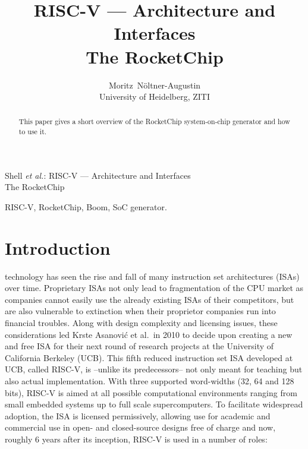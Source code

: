 \documentclass[journal,a4paper]{IEEEtran}
\def\krste/{Krste Asanovi\'c}
\begin{document}


\title{RISC-V --- Architecture and Interfaces\\The RocketChip}


\author{Moritz~N\"oltner-Augustin\\%
University of Heidelberg, ZITI}

%
{Shell \MakeLowercase{\textit{et al.}}: RISC-V --- Architecture and Interfaces\\The RocketChip}

\maketitle

\begin{abstract}
	This paper gives a short overview of the RocketChip system-on-chip generator and how to use it.
\end{abstract}

\begin{IEEEkeywords}
	RISC-V, RocketChip, Boom, SoC generator.
\end{IEEEkeywords}


\section{Introduction}
 technology has seen the rise and fall of many instruction set architectures (ISAs) over time.
Proprietary ISAs not only lead to fragmentation of the CPU market as companies cannot easily use the already existing ISAs of their competitors, but are also vulnerable to extinction when their proprietor companies run into financial troubles.
Along with design complexity and licensing issues, these considerations led \krste/ et al.\ in 2010 to decide upon creating a new and free ISA for their next round of research projects at the University of California Berkeley (UCB).
This fifth reduced instruction set ISA developed at UCB, called RISC-V\cite{riscv}, is --unlike its predecessors-- not only meant for teaching but also actual implementation.
With three supported word-widths (32, 64 and 128 bits\cite[Time: 17:55]{riscv-vid}), RISC-V is aimed at all possible computational environments ranging from small embedded systems up to full scale supercomputers.
To facilitate widespread adoption, the ISA is licensed permissively, allowing use for academic and commercial use in open- and closed-source designs free of charge and now, roughly 6 years after its inception, RISC-V is used in a number of roles:
\end{document}

